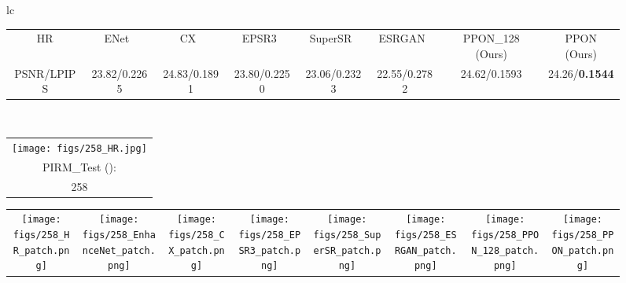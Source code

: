 \documentclass[preprint]{elsarticle}
\begin{document}
\begin{figure*}[htpb]
{\begin{tabular}{lc}
\begin{adjustbox}{valign=t}
\begin{tabular}{cccccccc}
					HR & \hspace{-3mm} ENet~\cite{EnhanceNet} & \hspace{-3mm} CX~\cite{CX} & \hspace{-3mm} EPSR3~\cite{EPSR} & 
					SuperSR~\cite{ESRGAN} & \hspace{-3mm} ESRGAN~\cite{ESRGAN} & \hspace{-3mm} PPON\_128 (Ours) & \hspace{-3mm} PPON (Ours) \\
					
					PSNR/LPIPS & \hspace{-3mm} 23.82/0.2265 & \hspace{-3mm} 24.83/0.1891 & \hspace{-3mm} 23.80/0.2250 &
					23.06/0.2323 & \hspace{-3mm} 22.55/0.2782 & \hspace{-3mm} 24.62/0.1593 & \hspace{-3mm} 24.26/\textbf{0.1544} \\
				\end{tabular}
			\end{adjustbox}
			\\
			\begin{adjustbox}{valign=t}
				\scriptsize
				\begin{tabular}{c}
					\texttt{[image: figs/258\_HR.jpg]} \\
					PIRM\_Test (): \\
					258 \\
				\end{tabular}
			\end{adjustbox}
			\hspace{-3mm}
			\begin{adjustbox}{valign=t}
				\scriptsize
				\begin{tabular}{cccccccc}
					\texttt{[image: figs/258\_HR\_patch.png]} &
					\hspace{-3mm}
					\texttt{[image: figs/258\_EnhanceNet\_patch.png]} &
					\hspace{-3mm}
					\texttt{[image: figs/258\_CX\_patch.png]} &
					\hspace{-3mm}
					\texttt{[image: figs/258\_EPSR3\_patch.png]} &
					\hspace{-3mm}					
					\texttt{[image: figs/258\_SuperSR\_patch.png]} &
					\hspace{-3mm}
					\texttt{[image: figs/258\_ESRGAN\_patch.png]} &
					\hspace{-3mm}
					\texttt{[image: figs/258\_PPON\_128\_patch.png]} &
					\hspace{-3mm}
					\texttt{[image: figs/258\_PPON\_patch.png]} \\
					

\end{tabular}
\end{adjustbox}
\end{tabular}}
\end{figure*}
\end{document}
